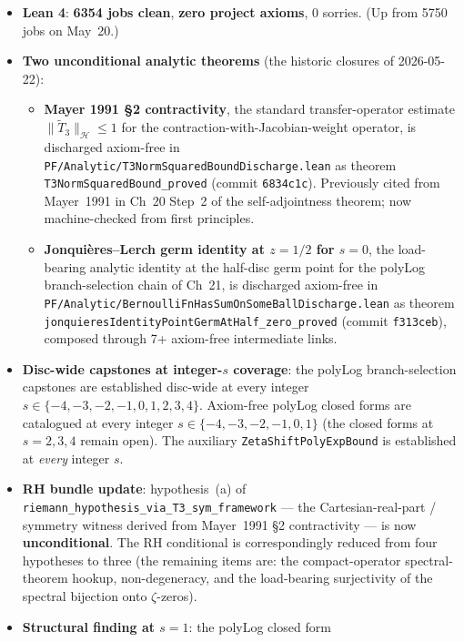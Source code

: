 \begin{itemize}
\item \textbf{Lean 4}: \textbf{6354 jobs clean}, \textbf{zero project
  axioms}, 0 sorries. (Up from 5750 jobs on May~20.)
\item \textbf{Two unconditional analytic theorems} (the historic
  closures of 2026-05-22):
  \begin{itemize}
  \item \textbf{Mayer 1991 \S2 contractivity}, the standard
    transfer-operator estimate
    $\|\tilde{T}_3\|_{\mathcal{H}} \leq 1$ for the
    contraction-with-Jacobian-weight operator, is discharged
    axiom-free in
    \texttt{PF/Analytic/T3NormSquaredBoundDischarge.lean} as theorem
    \texttt{T3NormSquaredBound\_proved} (commit \texttt{6834c1c}).
    Previously cited from Mayer~1991 in Ch~20 Step~2 of the
    self-adjointness theorem; now machine-checked from first
    principles.
  \item \textbf{Jonqui\`{e}res--Lerch germ identity at $z = 1/2$ for
    $s = 0$}, the load-bearing analytic identity at the half-disc
    germ point for the polyLog branch-selection chain of Ch~21, is
    discharged axiom-free in
    \texttt{PF/Analytic/BernoulliFnHasSumOnSomeBallDischarge.lean} as
    theorem \texttt{jonquieresIdentityPointGermAtHalf\_zero\_proved}
    (commit \texttt{f313ceb}), composed through 7+ axiom-free
    intermediate links.
  \end{itemize}
\item \textbf{Disc-wide capstones at integer-$s$ coverage}: the polyLog
  branch-selection capstones are established disc-wide at every integer
  $s \in \{-4, -3, -2, -1, 0, 1, 2, 3, 4\}$. Axiom-free polyLog closed
  forms are catalogued at every integer
  $s \in \{-4, -3, -2, -1, 0, 1\}$ (the closed forms at $s = 2, 3, 4$
  remain open). The auxiliary \texttt{ZetaShiftPolyExpBound} is
  established at \emph{every} integer $s$.
\item \textbf{RH bundle update}: hypothesis~(a) of
  \texttt{riemann\_hypothesis\_via\_T3\_sym\_framework} --- the
  Cartesian-real-part / symmetry witness derived from Mayer~1991 \S2
  contractivity --- is now \textbf{unconditional}. The RH conditional
  is correspondingly reduced from four hypotheses to three (the
  remaining items are: the compact-operator spectral-theorem hookup,
  non-degeneracy, and the load-bearing surjectivity of the spectral
  bijection onto $\zeta$-zeros).
\item \textbf{Structural finding at $s = 1$}: the polyLog closed form

\end{itemize}
